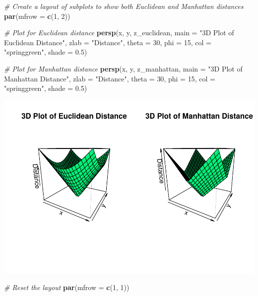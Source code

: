 \documentclass[
]{article}
\newenvironment{Shaded}{\begin{snugshade}}{\end{snugshade}}
\newcommand{\AttributeTok}[1]{\textcolor[rgb]{0.13,0.29,0.53}{#1}}
\newcommand{\CommentTok}[1]{\textcolor[rgb]{0.56,0.35,0.01}{\textit{#1}}}
\newcommand{\DecValTok}[1]{\textcolor[rgb]{0.00,0.00,0.81}{#1}}
\newcommand{\FloatTok}[1]{\textcolor[rgb]{0.00,0.00,0.81}{#1}}
\newcommand{\FunctionTok}[1]{\textcolor[rgb]{0.13,0.29,0.53}{\textbf{#1}}}
\newcommand{\NormalTok}[1]{#1}
\newcommand{\StringTok}[1]{\textcolor[rgb]{0.31,0.60,0.02}{#1}}
\begin{document}
\begin{Shaded}
\begin{Highlighting}[]
\CommentTok{\# Create a layout of subplots to show both Euclidean and Manhattan distances}
\FunctionTok{par}\NormalTok{(}\AttributeTok{mfrow =} \FunctionTok{c}\NormalTok{(}\DecValTok{1}\NormalTok{, }\DecValTok{2}\NormalTok{))}

\CommentTok{\# Plot for Euclidean distance}
\FunctionTok{persp}\NormalTok{(x, y, z\_euclidean,}
      \AttributeTok{main =} \StringTok{"3D Plot of Euclidean Distance"}\NormalTok{,}
      \AttributeTok{zlab =} \StringTok{"Distance"}\NormalTok{,}
      \AttributeTok{theta =} \DecValTok{30}\NormalTok{, }\AttributeTok{phi =} \DecValTok{15}\NormalTok{,}
      \AttributeTok{col =} \StringTok{"springgreen"}\NormalTok{, }\AttributeTok{shade =} \FloatTok{0.5}\NormalTok{)}

\CommentTok{\# Plot for Manhattan distance}
\FunctionTok{persp}\NormalTok{(x, y, z\_manhattan,}
      \AttributeTok{main =} \StringTok{"3D Plot of Manhattan Distance"}\NormalTok{,}
      \AttributeTok{zlab =} \StringTok{"Distance"}\NormalTok{,}
      \AttributeTok{theta =} \DecValTok{30}\NormalTok{, }\AttributeTok{phi =} \DecValTok{15}\NormalTok{,}
      \AttributeTok{col =} \StringTok{"springgreen"}\NormalTok{, }\AttributeTok{shade =} \FloatTok{0.5}\NormalTok{)}
\end{Highlighting}
\end{Shaded}

\includegraphics{week1_files/figure-latex/unnamed-chunk-4-1.pdf}

\begin{Shaded}
\begin{Highlighting}[]
\CommentTok{\# Reset the layout}
\FunctionTok{par}\NormalTok{(}\AttributeTok{mfrow =} \FunctionTok{c}\NormalTok{(}\DecValTok{1}\NormalTok{, }\DecValTok{1}\NormalTok{))}
\end{Highlighting}
\end{Shaded}
\end{document}
